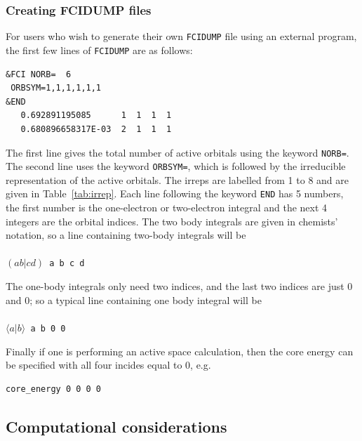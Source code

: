 \documentclass[letterpaper,12pt,aps, pra]{revtex4-1}
\begin{document}
\subsubsection{Creating FCIDUMP files}\label{sec:appFCIDUMP}
For users who wish to generate their own \texttt{FCIDUMP} file using an external program, the first few lines of \texttt{FCIDUMP} are as follows:
\begin{verbatim}
&FCI NORB=  6
 ORBSYM=1,1,1,1,1,1
&END
   0.692891195085      1  1  1  1
   0.680896658317E-03  2  1  1  1
\end{verbatim}
The first line gives the total number of active orbitals using the keyword \texttt{NORB=}. The second line uses the keyword \texttt{ORBSYM=}, which is followed by the irreducible representation of the active orbitals. The irreps are labelled from 1 to 8 and are given in Table~\ref{tab:irrep}.
Each line following the keyword \texttt{END} has 5 numbers, the first number is the one-electron or two-electron integral and the next 4 integers are the orbital indices. The two body integrals are given in chemists' notation, so a line containing two-body integrals will be\\
\texttt{
\\$( a b|cd)$ a b c d\\}
 
The one-body integrals only need two indices, and the last two indices are just 0 and 0; so a typical line containing one body integral will be\\
\texttt{
\\$\langle a|b\rangle$ a b 0 0\\}

Finally if one is performing an active space calculation, then the core energy can be specified with all four incides equal to 0, e.g.
\begin{verbatim}
core_energy 0 0 0 0
\end{verbatim}

\subsection{Computational considerations}\label{sec:computation}
\end{document}
